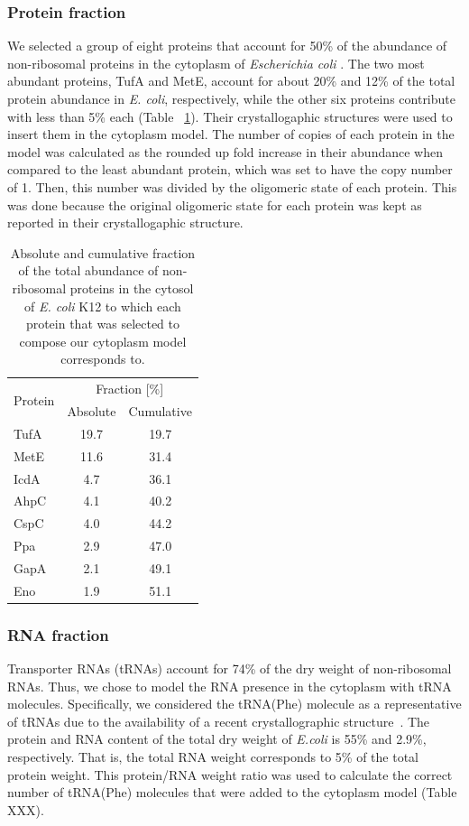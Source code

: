 \documentclass[journal=jacsat,manuscript=article]{achemso}
\begin{document}
\subsubsection{Protein fraction}
We selected a group of eight proteins that account for 50\% of the abundance of non-ribosomal proteins in the cytoplasm of {\em Escherichia coli} \cite{ref_prot_abundance}. The two most abundant proteins, TufA and MetE, account for about 20\% and 12\% of the total protein abundance in {\em E. coli}, respectively, while the other six proteins contribute with less than 5\% each (Table ~\ref{tbl:protein_fraction}). Their crystallogaphic structures were used to insert them in the cytoplasm model. The number of copies of each protein in the model was calculated as the rounded up fold increase in their abundance when compared to the least abundant protein, which was set to have the copy number of 1. Then, this number was divided by the oligomeric state of each protein. This was done because the original oligomeric state for each protein was kept as reported in their crystallogaphic structure.

\begin{table}
\centering
\begin{tabular}{ l c c }
\hline
\multirow{2}{*}{Protein} & 	\multicolumn{2}{c}{Fraction [\%]} \\
& Absolute & Cumulative \\ 
\hline
TufA & 19.7 & 19.7 \\
MetE & 11.6 & 31.4 \\
IcdA & 4.7  & 36.1 \\
AhpC & 4.1  & 40.2 \\
CspC & 4.0  & 44.2 \\
Ppa  & 2.9  & 47.0 \\
GapA & 2.1  & 49.1 \\
Eno  & 1.9  & 51.1 \\
\hline
\end{tabular}
\caption{Absolute and cumulative fraction of the total abundance of non-ribosomal proteins in the cytosol of {\em E. coli} K12 to which each protein that was selected to compose our cytoplasm model corresponds to.}
\label{tbl:protein_fraction}
\end{table}


\subsubsection{RNA fraction}
Transporter RNAs (tRNAs) account for 74\% of the dry weight of non-ribosomal RNAs. Thus, we chose to model the RNA presence in the cytoplasm with tRNA molecules. Specifically, we considered the tRNA(Phe) molecule as a representative of tRNAs due to the availability of a recent crystallographic structure~\cite{Byrne2015}.
The protein and RNA content of the total dry weight of \textit{E.coli} is 55\% and 2.9\%, respectively. That is, the total RNA weight corresponds to 5\% of the total protein weight. This protein/RNA weight ratio was used to calculate the correct number of tRNA(Phe) molecules that were added to the cytoplasm model \colorbox{red!50}{(Table XXX)}.
\end{document}

